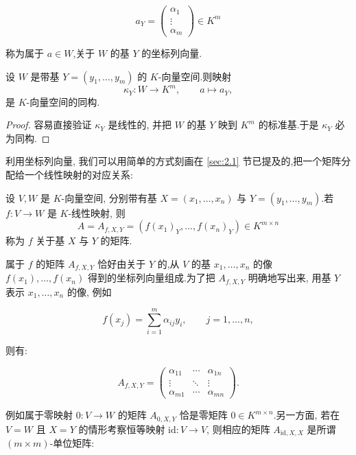 \[
a_Y = \begin{pmatrix} \alpha_1 \\ \vdots \\ \alpha_m \end{pmatrix} \in K^m
\]

称为属于 $a \in W$,关于 $W$ 的基 $Y$ 的坐标列向量.

\begin{remark}\label{rem:3.1.2}
设 $W$ 是带基 $Y = (y_1, \ldots, y_m)$ 的 $K$-向量空间.则映射
\[
\kappa_Y \colon W \longrightarrow K^m, \qquad a \longmapsto a_Y,
\]
是 $K$-向量空间的同构.
\end{remark}

\begin{proof}
容易直接验证 $\kappa_Y$ 是线性的, 并把 $W$ 的基 $Y$ 映到 $K^m$ 的标准基.于是 $\kappa_Y$ 必为同构.
\end{proof}

利用坐标列向量, 我们可以用简单的方式刻画在 \ref{sec:2.1} 节已提及的,把一个矩阵分配给一个线性映射的对应关系:

\begin{definition}[线性映射的矩阵]\label{def:3.1.3}
设 $V, W$ 是 $K$-向量空间, 分别带有基 $X = (x_1, \ldots, x_n)$ 与 $Y = (y_1, \ldots, y_m)$.若 $f \colon V \longrightarrow W$ 是 $K$-线性映射, 则
\[
A = A_{f, X, Y} = \left(f(x_1)_Y, \ldots, f(x_n)_Y\right) \in K^{m \times n}
\]
称为 $f$ 关于基 $X$ 与 $Y$ 的矩阵.
\end{definition}

属于 $f$ 的矩阵 $A_{f, X, Y}$ 恰好由关于 $Y$ 的,从 $V$ 的基 $x_1, \ldots, x_n$ 的像 $f(x_1), \ldots, f(x_n)$ 得到的坐标列向量组成.为了把 $A_{f, X, Y}$ 明确地写出来, 用基 $Y$ 表示 $x_1, \ldots, x_n$ 的像, 例如

\[
f(x_j) = \sum_{i = 1}^{m}\alpha_{ij}y_i, \qquad j = 1, \ldots, n,
\]

则有:

\[
A_{f, X, Y} =
\begin{pmatrix}
\alpha_{11} & \cdots & \alpha_{1n} \\
\vdots & \ddots & \vdots \\
\alpha_{m1} & \cdots & \alpha_{mn}
\end{pmatrix}\text{.}
\]

例如属于零映射 $0 \colon V \longrightarrow W$ 的矩阵 $A_{0, X, Y}$ 恰是零矩阵 $0 \in K^{m \times n}$.另一方面, 若在 $V = W$ 且 $X = Y$ 的情形考察恒等映射 $\mathrm{id} \colon V \longrightarrow V$, 则相应的矩阵 $A_{\mathrm{id}, X, X}$ 是所谓 $(m \times m)$-单位矩阵:

